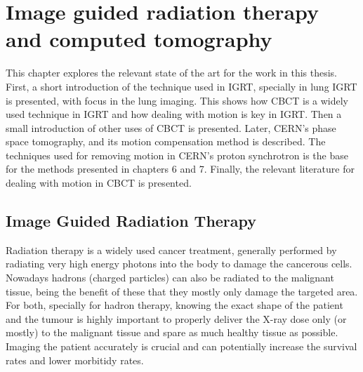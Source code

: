 \chapter{Image guided radiation therapy and computed tomography}\label{ch:soa}

This chapter explores the relevant state of the art for the work in this thesis. First, a short introduction of the technique used in IGRT, specially in lung IGRT is presented, with focus in the lung imaging. This shows how CBCT is a widely used technique in IGRT and how dealing with motion is key in IGRT. Then a small introduction of other uses of CBCT is presented. Later, CERN's phase space tomography, and its motion compensation method is described. The techniques used for removing motion in CERN's proton synchrotron is the base for the methods presented in chapters 6 and 7. Finally, the relevant literature for dealing with motion in CBCT is presented.


\section{Image Guided Radiation Therapy}
Radiation therapy is a widely used cancer treatment, generally performed by radiating very high energy photons into the body to damage the cancerous cells. Nowadays hadrons (charged particles) can also be radiated to the malignant tissue, being the benefit of these that they mostly only damage the targeted area. For both, specially for hadron therapy, knowing the exact shape of the patient and the tumour is highly important to properly deliver the X-ray dose only (or mostly) to the malignant tissue and spare as much healthy tissue as possible. Imaging the patient accurately is crucial and can potentially increase the survival rates and lower morbitidy rates\cite{nguyen2015potential}.

